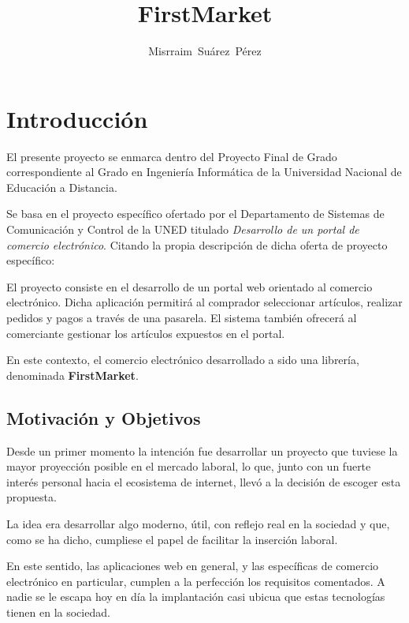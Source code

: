 \documentclass[a4paper]{report}
\author{Misrraim~Suárez~Pérez}
\title{FirstMarket}
\begin{document}
    \maketitle
    \tableofcontents

    \section{Introducción}
    El presente proyecto se enmarca dentro del Proyecto Final de Grado correspondiente al Grado en Ingeniería Informática
    de la Universidad Nacional de Educación a Distancia.

    Se basa en el proyecto específico ofertado por el Departamento de Sistemas de Comunicación y Control de la UNED titulado \emph{Desarrollo de un portal de comercio electrónico}.
    Citando la propia descripción de dicha oferta de proyecto específico:
    
    \begin{displayquote}
        El proyecto consiste en el desarrollo de un portal web orientado al comercio electrónico.
        Dicha aplicación permitirá al comprador seleccionar artículos, realizar pedidos y pagos a través de una pasarela.
        El sistema también ofrecerá al comerciante gestionar los artículos expuestos en el portal.
    \end{displayquote}

	En este contexto, el comercio electrónico desarrollado a sido una librería, denominada \textbf{FirstMarket}.

    \subsection{Motivación y Objetivos}
    Desde un primer momento la intención fue desarrollar un proyecto que tuviese la mayor proyección posible en el mercado laboral, lo que,
    junto con un fuerte interés personal hacia el ecosistema de internet, llevó a la decisión de escoger esta propuesta.

    La idea era desarrollar algo moderno, útil, con reflejo real en la sociedad y que, como se ha dicho, cumpliese el papel de facilitar la inserción laboral.

    En este sentido, las aplicaciones web en general, y las específicas de comercio electrónico en particular, cumplen a la perfección los requisitos comentados.
    A nadie se le escapa hoy en día la implantación casi ubicua que estas tecnologías tienen en la sociedad.
\end{document}
